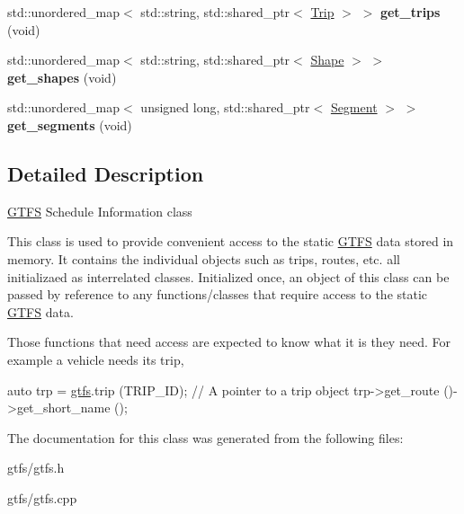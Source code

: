 \begin{DoxyCompactItemize}
std\+::unordered\+\_\+map$<$ std\+::string, std\+::shared\+\_\+ptr$<$ \hyperlink{classgtfs_1_1Trip}{Trip} $>$ $>$ {\bfseries get\+\_\+trips} (void)
\item 
\mbox{\label{classgtfs_1_1GTFS_a91ada6a3f02e3ee9b6a723a6c6fc50af}} 
std\+::unordered\+\_\+map$<$ std\+::string, std\+::shared\+\_\+ptr$<$ \hyperlink{classgtfs_1_1Shape}{Shape} $>$ $>$ {\bfseries get\+\_\+shapes} (void)
\item 
\mbox{\label{classgtfs_1_1GTFS_ae124db38217498c5e1090447ccf11953}} 
std\+::unordered\+\_\+map$<$ unsigned long, std\+::shared\+\_\+ptr$<$ \hyperlink{classgtfs_1_1Segment}{Segment} $>$ $>$ {\bfseries get\+\_\+segments} (void)
\end{DoxyCompactItemize}


\subsection{Detailed Description}
\hyperlink{classgtfs_1_1GTFS}{G\+T\+FS} Schedule Information class

This class is used to provide convenient access to the static \hyperlink{classgtfs_1_1GTFS}{G\+T\+FS} data stored in memory. It contains the individual objects such as trips, routes, etc. all initializaed as interrelated classes. Initialized once, an object of this class can be passed by reference to any functions/classes that require access to the static \hyperlink{classgtfs_1_1GTFS}{G\+T\+FS} data.

Those functions that need access are expected to know what it is they need. For example a vehicle needs it\textquotesingle{}s trip, 
\begin{DoxyCode}
\textcolor{keyword}{auto} trp = \hyperlink{namespacegtfs}{gtfs}.trip (TRIP\_ID); \textcolor{comment}{// A pointer to a trip object}
trp->get\_route ()->get\_short\_name ();
\end{DoxyCode}
 

The documentation for this class was generated from the following files\+:\begin{DoxyCompactItemize}
\item 
gtfs/gtfs.\+h\item 
gtfs/gtfs.\+cpp\end{DoxyCompactItemize}
